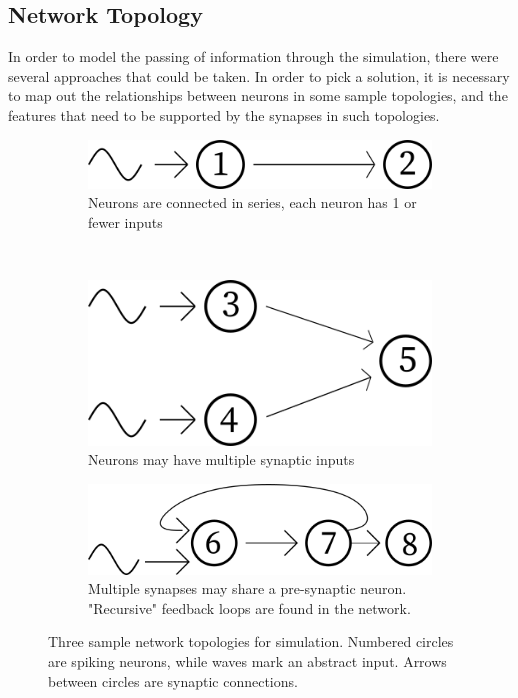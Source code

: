 \subsection{Network Topology}

In order to model the passing of information through the simulation, there were
several approaches that could be taken. In order to pick a solution, it is
necessary to map out the relationships between neurons in some sample topologies,
and the features that need to be supported by the synapses in such topologies. 


\begin{figure}[h!]
    \begin{subfigure}{1\textwidth}
        \centering
        \includegraphics[width=0.35\linewidth]{figures/tops/top1.png}
        \caption{Neurons are connected in series, each neuron has 1 or fewer inputs}
        \label{fig:top1}
    \end{subfigure} \vspace{1ex} \\ 
    \begin{subfigure}{.5\textwidth}
        \centering
        \includegraphics[width=0.7\linewidth]{figures/tops/top2.png}
        \caption{Neurons may have multiple synaptic inputs}
        \label{fig:top2}
    \end{subfigure}
    \begin{subfigure}{.5\textwidth}
        \centering
        \includegraphics[width=0.7\linewidth]{figures/tops/top3.png}
        \caption{Multiple synapses may share a pre-synaptic neuron. "Recursive" feedback loops are found in the network.}
        \label{fig:top3}
    \end{subfigure}
    \caption[Sample network topologies for simulation]{Three sample network topologies for simulation. Numbered circles are spiking neurons, while waves mark an abstract input. Arrows between circles are synaptic connections.}
    \label{fig:tops}
\end{figure}

